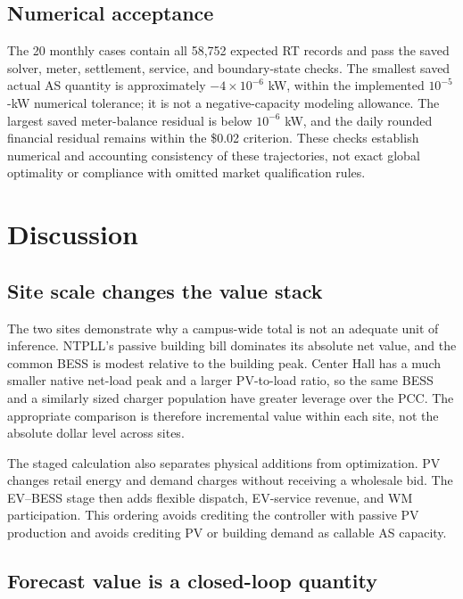 \documentclass[final,5p,times]{elsarticle}
\begin{document}
\clearpage
\subsection{Numerical acceptance}
\label{sec:site_validation_results}

The 20 monthly cases contain all 58,752 expected RT records and pass the
saved solver, meter, settlement, service, and boundary-state checks. The smallest saved actual AS quantity is approximately $-4\times10^{-6}$ kW, within the implemented $10^{-5}$-kW numerical tolerance; it is not a negative-capacity modeling allowance. The largest
saved meter-balance residual is below $10^{-6}$ kW, and the daily rounded
financial residual remains within the \$0.02 criterion. These checks establish
numerical and accounting consistency of these trajectories, not exact
global optimality or compliance with omitted market qualification rules.

\section{Discussion}
\label{sec:discussion}

\subsection{Site scale changes the value stack}

The two sites demonstrate why a campus-wide total is not an adequate unit of
inference. NTPLL's passive building bill dominates its absolute net value, and
the common BESS is modest relative to the building peak. Center Hall has a much
smaller native net-load peak and a larger PV-to-load ratio, so the same BESS and
a similarly sized charger population have greater leverage over the PCC. The
appropriate comparison is therefore incremental value within each site, not
the absolute dollar level across sites.

The staged calculation also separates physical additions from optimization.
PV changes retail energy and demand charges without receiving a wholesale bid.
The EV--BESS stage then adds flexible dispatch, EV-service revenue, and WM
participation. This ordering avoids crediting the controller with passive PV
production and avoids crediting PV or building demand as callable AS capacity.

\subsection{Forecast value is a closed-loop quantity}
\end{document}
